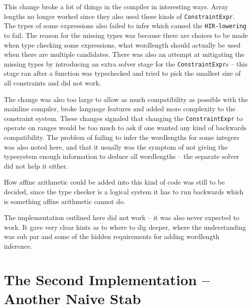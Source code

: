 This change broke a lot of things in the compiler in interesting ways. Array lengths no longer worked since they also used these kinds of \verb+ConstraintExpr+. The types of some expressions also failed to infer which caused the \verb+HIR-lowering+ to fail. The reason for the missing types was because there are choices to be made when type checking some expressions, what wordlength should actually be used when there are multiple candidates. There was also an attempt at mitigating the missing types by introducing an extra solver stage for the \verb+ConstraintExpr+s -- this stage ran after a function was typechecked and tried to pick the smallest size of all constraints and did not work.

The change was also too large to allow as much compatibility as possible with the mainline compiler, broke language features and added more complexity to the constraint system. These changes signaled that changing the \verb+ConstraintExpr+ to operate on ranges would be too much to ask if one wanted any kind of backwards compatibility. The problem of failing to infer the wordlengths for some integers was also noted here, and that it usually was the symptom of not giving the typesystem enough information to deduce all wordlengths -- the separate solver did not help it either.

How affine arithmetic could be added into this kind of code was still to be decided, since the type checker is a logical system it has to run backwards which is something affine arithmetic cannot do.

The implementation outlined here did not work -- it was also never expected to work. It gave very clear hints as to where to dig deeper, where the understanding was sub par and some of the hidden requirements for adding wordlength inference.

\section{The Second Implementation -- Another Naive Stab}
\label{sec:Second}

